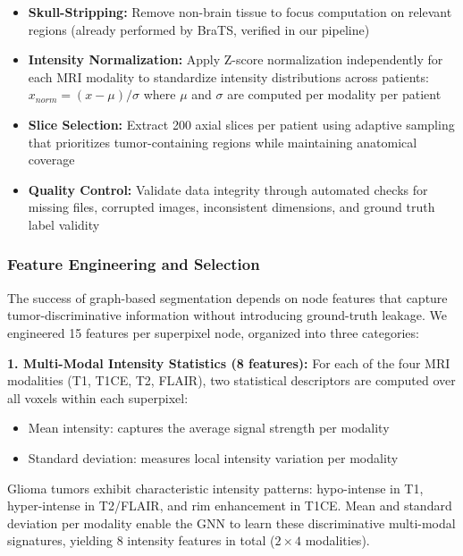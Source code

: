 \begin{itemize}
    \item \textbf{Skull-Stripping:} Remove non-brain tissue to focus computation on relevant regions (already performed by BraTS, verified in our pipeline)
    
    \item \textbf{Intensity Normalization:} Apply Z-score normalization independently for each MRI modality to standardize intensity distributions across patients: $x_{norm} = (x - \mu) / \sigma$ where $\mu$ and $\sigma$ are computed per modality per patient
    
    \item \textbf{Slice Selection:} Extract 200 axial slices per patient using adaptive sampling that prioritizes tumor-containing regions while maintaining anatomical coverage
    
    \item \textbf{Quality Control:} Validate data integrity through automated checks for missing files, corrupted images, inconsistent dimensions, and ground truth label validity
\end{itemize}

\subsubsection{Feature Engineering and Selection}

The success of graph-based segmentation depends on node features that capture tumor-discriminative information without introducing ground-truth leakage. We engineered 15 features per superpixel node, organized into three categories:

\textbf{1. Multi-Modal Intensity Statistics (8 features):} For each of the four MRI modalities (T1, T1CE, T2, FLAIR), two statistical descriptors are computed over all voxels within each superpixel:
\begin{itemize}
    \item Mean intensity: captures the average signal strength per modality
    \item Standard deviation: measures local intensity variation per modality
\end{itemize}

Glioma tumors exhibit characteristic intensity patterns: hypo-intense in T1, hyper-intense in T2/FLAIR, and rim enhancement in T1CE. Mean and standard deviation per modality enable the GNN to learn these discriminative multi-modal signatures, yielding 8 intensity features in total ($2 \times 4$ modalities).

